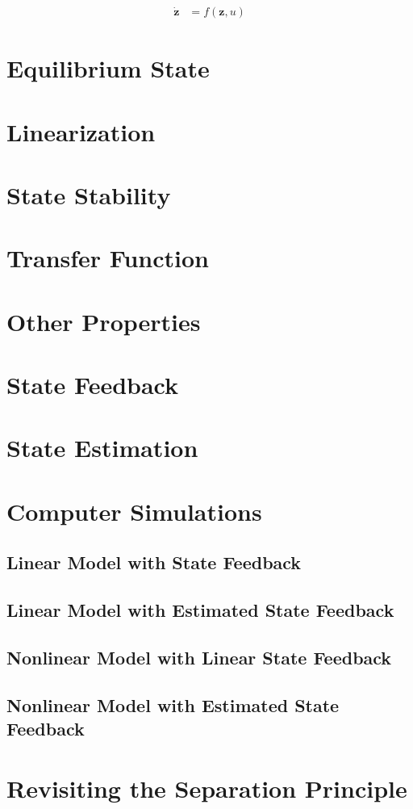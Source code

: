 \documentclass[]{article}
\begin{document}
\begin{align*}
	\dot{\mathbf{z}} &= f(\mathbf{z}, u)
\end{align*}

\section{Equilibrium State}

\section{Linearization}

\section{State Stability}

\section{Transfer Function}

\section{Other Properties}

\section{State Feedback}

\section{State Estimation}

\section{Computer Simulations}

\subsection{Linear Model with State Feedback}

\subsection{Linear Model with Estimated State Feedback}

\subsection{Nonlinear Model with Linear State Feedback}

\subsection{Nonlinear Model with Estimated State Feedback}

\section{Revisiting the Separation Principle}
\end{document}
